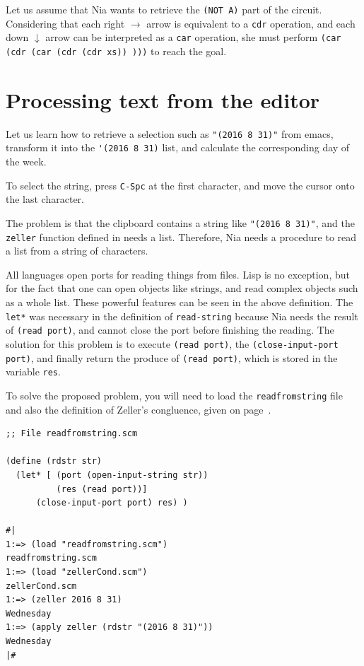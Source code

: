 \documentclass[a4paper,12pt]{book}
\begin{document}
Let us assume that Nia wants to retrieve the
\verb|(NOT A)| part of the circuit. Considering
that each right $\rightarrow$ arrow is equivalent
to a \verb|cdr| operation, and each down $\downarrow$
arrow can be interpreted as a \verb|car| operation,
she must perform \verb|(car (cdr (car (cdr (cdr xs)) )))|
to reach the goal.


\section{Processing text from the editor}
Let us learn how to retrieve a selection such as
\verb|"(2016 8 31)"| from emacs,
transform it into the \verb|'(2016 8 31)|
list, and calculate the corresponding
day of the week.

To select the string, press \verb|C-Spc|
at the first character, and
move the cursor onto the last character.

The problem is that the clipboard
contains a string like \verb|"(2016 8 31)"|, and
the \verb|zeller| function defined in needs a list.
Therefore, Nia needs a procedure to
read a list from a string of characters.

All languages open ports for reading things
from files. Lisp is no exception, but for
the fact that one can open objects like
strings, and read complex objects such
as a whole list. These powerful features
can be seen in the above definition.
The \verb|let*| was necessary in the 
definition of \verb|read-string| because
Nia needs the result of \verb|(read port)|,
and cannot close the port before finishing
the reading. The solution for this problem
is to execute \verb|(read port)|, 
the \verb|(close-input-port port)|, and
finally return the produce of \verb|(read port)|,
which is stored in the variable \verb|res|.

To solve the proposed problem, you will need to load
the \verb|readfromstring| file and also the definition
of Zeller's congluence, given on
page~\pageref{fig:day-of-the-week}.

\begin{verbatim}
;; File readfromstring.scm

(define (rdstr str)
  (let* [ (port (open-input-string str))
          (res (read port))]
      (close-input-port port) res) )

#|
1:=> (load "readfromstring.scm")
readfromstring.scm
1:=> (load "zellerCond.scm")
zellerCond.scm
1:=> (zeller 2016 8 31)
Wednesday
1:=> (apply zeller (rdstr "(2016 8 31)"))
Wednesday
|#
\end{verbatim}
\end{document}
